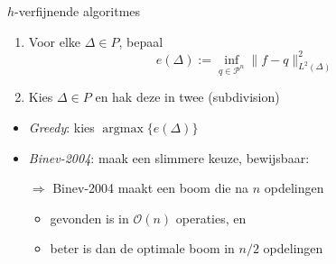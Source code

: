 \documentclass{beamer}
\begin{document}
\begin{frame}{$h$-verfijnende algoritmes}
\begin{enumerate}
    \item Voor elke $\Delta \in P$, bepaal
      \[
        e(\Delta) := \inf_{q \in \mathcal{P}^n} \| f - q\|_{L^2(\Delta)}^2
      \]
    \item \alert{Kies} $\Delta \in P$ en hak deze in twee (subdivision)
\end{enumerate} \pause
\begin{itemize}
  \item \emph{Greedy}: kies $\operatorname{argmax}\{ e(\Delta)\}$ \pause
  \item \emph{Binev-2004}: maak een slimmere keuze, \pause bewijsbaar:
  \item[$\Rightarrow$] Binev-2004 maakt een boom die na $n$ opdelingen \pause
  \begin{itemize}
    \item gevonden is in $\mathcal{O}(n)$ operaties, \pause en
    \item beter is dan de optimale boom in $n/2$ opdelingen
  \end{itemize}
\end{itemize}
\end{frame}
\end{document}

